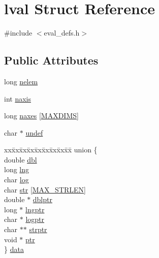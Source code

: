 \hypertarget{structlval}{}\section{lval Struct Reference}
\label{structlval}


{\ttfamily \#include $<$eval\+\_\+defs.\+h$>$}

\subsection*{Public Attributes}
\begin{DoxyCompactItemize}
\item 
long \hyperlink{structlval_ab74545461b3676f0c1a6e66835f4ec6a}{nelem}
\item 
int \hyperlink{structlval_a01162544dcb3c44ef01bf40c19f62cca}{naxis}
\item 
long \hyperlink{structlval_a86cecd3ad86b481e49a21cf2c75e21fb}{naxes} \mbox{[}\hyperlink{eval__defs_8h_a45ed35a158331b8f57fd66c5a18fa835}{M\+A\+X\+D\+I\+MS}\mbox{]}
\item 
char $\ast$ \hyperlink{structlval_a99e919cba19f82c5af4cfe3442c28069}{undef}
\item 
\begin{tabbing}
xx\=xx\=xx\=xx\=xx\=xx\=xx\=xx\=xx\=\kill
union \{\\
\>double \hyperlink{structlval_a9ab25e21a7b978efe0103a1434d3a412}{dbl}\\
\>long \hyperlink{structlval_accbce5351879a905dfb3f94149d7ced8}{lng}\\
\>char \hyperlink{structlval_a2d8aa7ae323c33a2b2024170f4b82cae}{log}\\
\>char \hyperlink{structlval_a704bda3b3b03c2b2562e5907d1546fcb}{str} \mbox{[}\hyperlink{eval__defs_8h_ae381522e1d10c3730b356f1ac5d2dccb}{MAX\_STRLEN}\mbox{]}\\
\>double $\ast$ \hyperlink{structlval_a1518016fb83e6088ed4c871b80c9b355}{dblptr}\\
\>long $\ast$ \hyperlink{structlval_a6b35d839b8cc64faac567eca9b004ae5}{lngptr}\\
\>char $\ast$ \hyperlink{structlval_a557a9410079510e1aa163501e1313283}{logptr}\\
\>char $\ast$$\ast$ \hyperlink{structlval_a3b6a0197f796fb3f6e04c899a29f2652}{strptr}\\
\>void $\ast$ \hyperlink{structlval_ad3ff48f2e57781c5d31bef418aa454e0}{ptr}\\
\} \hyperlink{structlval_aaa6e650bdaf2c5a36f5a6ddf6f0db94d}{data}\\

\end{tabbing}\end{DoxyCompactItemize}


